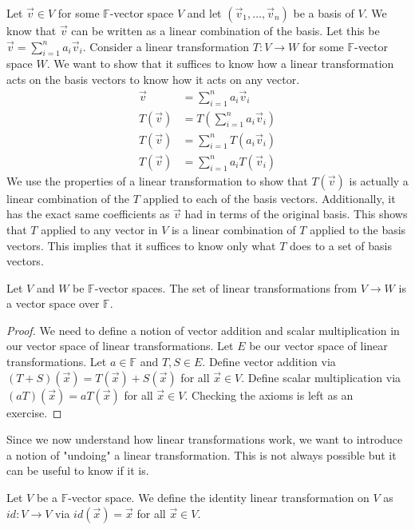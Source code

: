 \begin{remark}
    Let $\vec{v}\in V$ for some $\mathbb{F}$-vector space $V$ and let $(\vec{v}_1,\ldots,\vec{v}_n)$ be a basis of $V$. We know that $\vec{v}$ can be written as a linear combination of the basis. Let this be $\vec{v}=\sum_{i=1}^n a_i\vec{v}_i$. Consider a linear transformation $T:V\to W$ for some $\mathbb{F}$-vector space $W$. We want to show that it suffices to know how a linear transformation acts on the basis vectors to know how it acts on any vector.
    \begin{align*}
        \vec{v}&=\sum_{i=1}^n a_i\vec{v}_i\\
        T(\vec{v})&=T(\sum_{i=1}^n a_i\vec{v}_i)\\
        T(\vec{v})&=\sum_{i=1}^n T(a_i\vec{v}_i)\tag{use property (1)}\\
        T(\vec{v})&=\sum_{i=1}^n a_iT(\vec{v}_i)\tag{use property (2)}
    \end{align*}
    We use the properties of a linear transformation to show that $T(\vec{v})$ is actually a linear combination of the $T$ applied to each of the basis vectors. Additionally, it has the exact same coefficients as $\vec{v}$ had in terms of the original basis. This shows that $T$ applied to any vector in $V$ is a linear combination of $T$ applied to the basis vectors. This implies that it suffices to know only what $T$ does to a set of basis vectors.
\end{remark}
\begin{theorem}
    Let $V$ and $W$ be $\mathbb{F}$-vector spaces. The set of linear transformations from $V\to W$ is a vector space over $\mathbb{F}$.
\end{theorem}
\begin{proof}
    We need to define a notion of vector addition and scalar multiplication in our vector space of linear transformations. Let $E$ be our vector space of linear transformations. Let $a\in\mathbb{F}$ and $T, S\in E$. Define vector addition via $(T+S)(\vec{x})=T(\vec{x})+S(\vec{x})$ for all $\vec{x}\in V$. Define scalar multiplication via $(aT)(\vec{x})=aT(\vec{x})$ for all $\vec{x}\in V$. Checking the axioms is left as an exercise.
\end{proof}
Since we now understand how linear transformations work, we want to introduce a notion of "undoing" a linear transformation. This is not always possible but it can be useful to know if it is.
\begin{definition}
    Let $V$ be a $\mathbb{F}$-vector space. We define the identity linear transformation on $V$ as $id: V\to V$ via $id(\vec{x})=\vec{x}$ for all $\vec{x}\in V$.
\end{definition}
